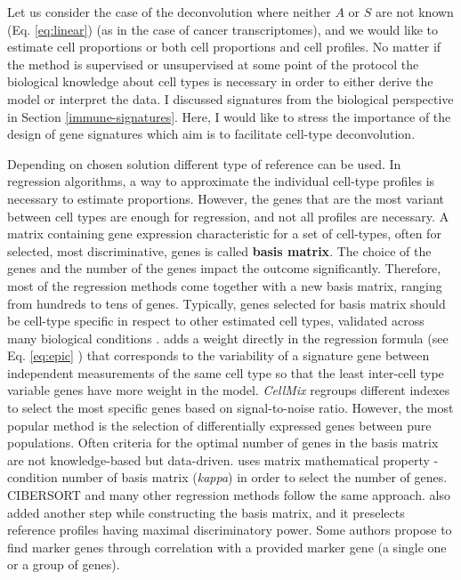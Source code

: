 \documentclass[12pt,]{book}
\theoremstyle{definition}
\theoremstyle{definition}
\theoremstyle{definition}
\theoremstyle{remark}
\begin{document}
Let us consider the case of the deconvolution where neither \(A\) or
\(S\) are not known (Eq. \eqref{eq:linear}) (as in the case of cancer
transcriptomes), and we would like to estimate cell proportions or both
cell proportions and cell profiles. No matter if the method is
supervised or unsupervised at some point of the protocol the biological
knowledge about cell types is necessary in order to either derive the
model or interpret the data. I discussed signatures from the biological
perspective in Section \ref{immune-signatures}. Here, I would like to
stress the importance of the design of gene signatures which aim is to
facilitate cell-type deconvolution.

Depending on chosen solution different type of reference can be used. In
regression algorithms, a way to approximate the individual cell-type
profiles is necessary to estimate proportions. However, the genes that
are the most variant between cell types are enough for regression, and
not all profiles are necessary. A matrix containing gene expression
characteristic for a set of cell-types, often for selected, most
discriminative, genes is called \textbf{basis matrix}. The choice of the
genes and the number of the genes impact the outcome
\citep{Vallania2017} significantly. Therefore, most of the regression
methods come together with a new basis matrix, ranging from hundreds to
tens of genes. Typically, genes selected for basis matrix should be
cell-type specific in respect to other estimated cell types, validated
across many biological conditions \citep{Hoffmann2006}.
\citet{Racle2017} adds a weight directly in the regression formula (see
Eq. \eqref{eq:epic} ) that corresponds to the variability of a signature
gene between independent measurements of the same cell type so that the
least inter-cell type variable genes have more weight in the model.
\emph{CellMix} \citep{Gaujoux2013} regroups different indexes to select
the most specific genes based on signal-to-noise ratio. However, the
most popular method is the selection of differentially expressed genes
between pure populations. Often criteria for the optimal number of genes
in the basis matrix are not knowledge-based but data-driven.
\citet{Abbas2009} uses matrix mathematical property - condition number
of basis matrix (\emph{kappa}) in order to select the number of genes.
CIBERSORT and many other regression methods follow the same approach.
\citet{Newman2015} also added another step while constructing the basis
matrix, and it preselects reference profiles having maximal
discriminatory power. Some authors \citep{Ju2013, Nelms2016} propose to
find marker genes through correlation with a provided marker gene (a
single one or a group of genes).
\end{document}
